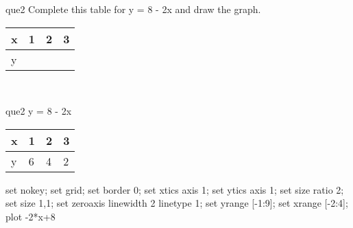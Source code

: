 \documentclass[13.5pt, varwidth=true]{beamer}
\begin{document}
\begin{frame}[shrink=19,fragile]
	\begin{beamercolorbox}[rounded=true, left, shadow=true,wd=14.8cm]{que2}
		 Complete this table for y = 8 - 2x and draw the graph. \\[0.3cm] \renewcommand{\arraystretch}{1.2}\begin{tabular}{|C|C|C|C|} \hline x & 1 & 2 & 3 \\ \hline y & & & \\ \hline \end{tabular}\\[0.3cm]
	\end{beamercolorbox}
\end{frame}
\begin{frame}[shrink=19,fragile]
	\begin{beamercolorbox}[rounded=true, left, shadow=true,wd=14.8cm]{que2}
 		y = 8 - 2x\renewcommand{\arraystretch}{1.2}\begin{tabular}{|C|C|C|C|} \hline x & 1 & 2 & 3 \\ \hline y & 6 & 4 & 2\\ \hline \end{tabular}\begin{gnuplot}[terminal=pdf] set nokey; set grid; set border 0; set xtics axis 1; set ytics axis 1; set size ratio 2; set size 1,1; set zeroaxis linewidth 2 linetype 1; set yrange [-1:9]; set xrange [-2:4]; plot -2*x+8 \end{gnuplot}
	\end{beamercolorbox}
\end{frame}
\end{document}
